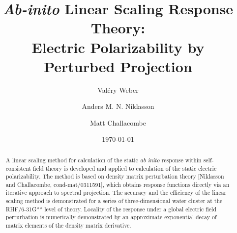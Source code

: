 \documentclass[prl,aps,twocolumn,showpacs,twocolumngrid,superbib]{revtex4}
\begin{document}
\title{\emph{Ab-inito} Linear Scaling Response Theory: \\ 
             Electric Polarizability by Perturbed Projection }

\author{Val\'ery Weber}
\author{Anders M. N. Niklasson}
\author{Matt Challacombe}

\date{\today}

\begin{abstract}
A linear scaling method for calculation of the static {\em ab inito} response within self-consistent field theory 
is developed and applied to calculation of the static electric polarizability.  The method is based on 
density matrix perturbation theory [Niklasson and Challacombe, cond-mat/0311591], which obtains response functions
directly via an iterative approach to spectral projection.
The accuracy and the efficiency of the linear scaling method is demonstrated for a series of three-dimensional 
water cluster at the RHF/6-31G** level of theory.  Locality of the response under a global electric field 
perturbation is numerically demonstrated by an approximate exponential decay of matrix elements of the density 
matrix derivative.
\end{abstract}

\maketitle

\end{document}
